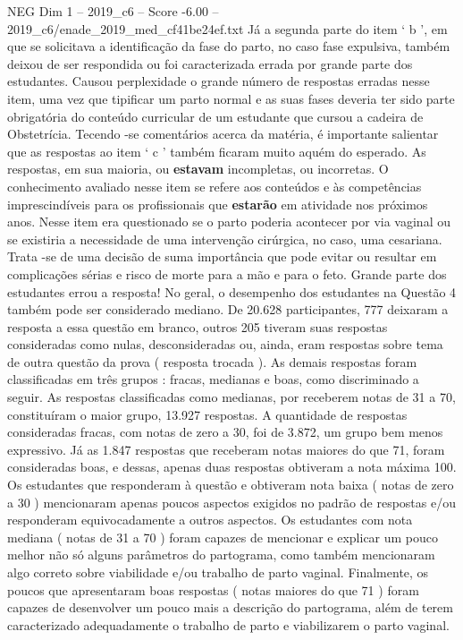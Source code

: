 \begin{textsample}{NEG Dim 1 – 2019\_c6 – Score -6.00 – 2019\_c6/enade\_2019\_med\_cf41be24ef.txt}
Já a segunda parte do item ‘ b ’, em que se solicitava a identificação da fase do parto, no caso fase expulsiva, também deixou de ser respondida ou foi caracterizada errada por grande parte dos estudantes.
Causou perplexidade o grande número de respostas erradas nesse item, uma vez que tipificar um parto normal e as suas fases deveria ter sido parte obrigatória do conteúdo curricular de um estudante que cursou a cadeira de Obstetrícia.
Tecendo -se comentários acerca da matéria, é importante salientar que as respostas ao item ‘ c ’ também ficaram muito aquém do esperado.
As respostas, em sua maioria, ou \textbf{estavam} incompletas, ou incorretas.
O conhecimento avaliado nesse item se refere aos conteúdos e às competências imprescindíveis para os profissionais que \textbf{estarão} em atividade nos próximos anos.
Nesse item era questionado se o parto poderia acontecer por via vaginal ou se existiria a necessidade de uma intervenção cirúrgica, no caso, uma cesariana.
Trata -se de uma decisão de suma importância que pode evitar ou resultar em complicações sérias e risco de morte para a mão e para o feto.
Grande parte dos estudantes errou a resposta!
No geral, o desempenho dos estudantes na Questão 4 também pode ser considerado mediano.
De 20.628 participantes, 777 deixaram a resposta a essa questão em branco, outros 205 tiveram suas respostas consideradas como nulas, desconsideradas ou, ainda, eram respostas sobre tema de outra questão da prova ( resposta trocada ).
As demais respostas foram classificadas em três grupos : fracas, medianas e boas, como discriminado a seguir.
As respostas classificadas como medianas, por receberem notas de 31 a 70, constituíram o maior grupo, 13.927 respostas.
A quantidade de respostas consideradas fracas, com notas de zero a 30, foi de 3.872, um grupo bem menos expressivo.
Já as 1.847 respostas que receberam notas maiores do que 71, foram consideradas boas, e dessas, apenas duas respostas obtiveram a nota máxima 100.
Os estudantes que responderam à questão e obtiveram nota baixa ( notas de zero a 30 ) mencionaram apenas poucos aspectos exigidos no padrão de respostas e/ou responderam equivocadamente a outros aspectos.
Os estudantes com nota mediana ( notas de 31 a 70 ) foram capazes de mencionar e explicar um pouco melhor não só alguns parâmetros do partograma, como também mencionaram algo correto sobre viabilidade e/ou trabalho de parto vaginal.
Finalmente, os poucos que apresentaram boas respostas ( notas maiores do que 71 ) foram capazes de desenvolver um pouco mais a descrição do partograma, além de terem caracterizado adequadamente o trabalho de parto e viabilizarem o parto vaginal.

\end{textsample}
